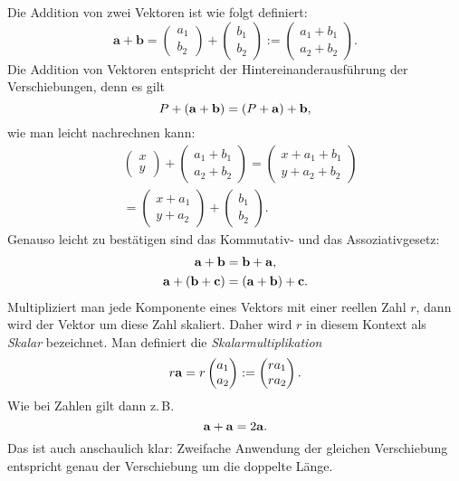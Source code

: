 Die Addition von zwei Vektoren ist wie folgt definiert:%
\begin{equation}
\mathbf a+\mathbf b = \begin{pmatrix}a_1\\ b_2\end{pmatrix}
+\begin{pmatrix}b_1\\ b_2\end{pmatrix}
:= \begin{pmatrix}a_1+b_1\\ a_2+b_2\end{pmatrix}.
\end{equation}
Die Addition von Vektoren entspricht der Hintereinanderausführung
der Verschiebungen, denn es gilt%
\begin{equation}
P+(\mathbf{a}+\mathbf{b}) = (P+\mathbf{a})+\mathbf{b},
\end{equation}
wie man leicht nachrechnen kann:
\begin{align*}
&\begin{pmatrix}x\\ y\end{pmatrix}
+ \begin{pmatrix}a_1+b_1\\ a_2+b_2\end{pmatrix}
= \begin{pmatrix}x+a_1+b_1\\ y+a_2+b_2\end{pmatrix}\\
&= \begin{pmatrix}x+a_1\\ y+a_2\end{pmatrix}
+ \begin{pmatrix}b_1\\ b_2\end{pmatrix}.
\end{align*}
Genauso leicht zu bestätigen sind das Kommutativ-
und das Assoziativgesetz:%
\begin{gather}
\mathbf{a}+\mathbf{b} = \mathbf{b}+\mathbf{a},\\
\mathbf{a}+(\mathbf{b}+\mathbf{c}) = (\mathbf{a}+\mathbf{b})+\mathbf{c}.
\end{gather}
Multipliziert man jede Komponente eines Vektors mit einer reellen
Zahl $r$, dann wird der Vektor um diese Zahl skaliert. Daher
wird $r$ in diesem Kontext als \emph{Skalar} bezeichnet. Man
definiert die \emph{Skalarmultiplikation}%
\begin{equation}
r\mathbf{a} = r\begin{pmatrix}a_1\\ a_2\end{pmatrix}
:= \begin{pmatrix}ra_1\\ ra_2\end{pmatrix}.
\end{equation}
Wie bei Zahlen gilt dann z.\,B.
\[\mathbf{a}+\mathbf{a} = 2\mathbf{a}.\]
Das ist auch anschaulich klar: Zweifache Anwendung der gleichen
Verschiebung entspricht genau der Verschiebung um die doppelte Länge.

